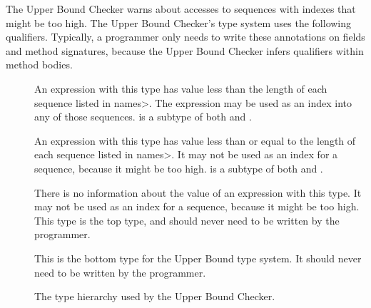 The Upper Bound Checker warns about accesses to sequences with indexes that might be
too high.
The Upper Bound Checker's type system uses the following qualifiers.
Typically, a programmer only needs to write these annotations on
fields and method signatures, because the Upper Bound Checker infers
qualifiers within method bodies.

\begin{description}
\item[]
  An expression with this type
  has value less than the length of each sequence listed in \<names>.
  The expression may be used as an index into any of those sequences.
   is a subtype of both
   and .
\item[]
  An expression with this type
  has value less than or equal to the length of each sequence listed in \<names>.
  It may not be used as an index for a sequence, because it might be too high.
   is a subtype of both
   and .
\item[]
  There is no information about the value of an expression with this type.
  It may not be used as an index for a sequence, because it might be too high.
  This type is the top type, and should never need to be written by the
  programmer.
\item[]
  This is the bottom type for the Upper Bound type system. It should
  never need to be written by the programmer.
  \end{description}

\begin{figure}
  \caption{The type hierarchy used by the Upper Bound Checker.}
  \label{fig-upperbound-types}
\end{figure}



